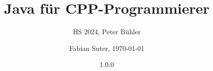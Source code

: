 \documentclass[fontsize=8pt, a4paper, fleqn, landscape, DIV=calc]{scrartcl}
\title{\vspace{-1cm}Java für CPP-Programmierer}
\subtitle{HS 2024, Peter Bühler}
\author{Fabian Suter, \today}
\date{{\small 1.0.0}}
\begin{document}
	\begin{multicols*}{3}
        \raggedcolumns
        \begin{minipage}{0.75\columnwidth}
		      \maketitle
        \end{minipage}
        \begin{minipage}{0.2\columnwidth}
            \begin{center}
                \quad
                \qquad    
            \end{center}
        \end{minipage}
        
        \thispagestyle{fancy}%

        
        
        
        
        
        
        
        
        
        
	\end{multicols*}
\end{document}
